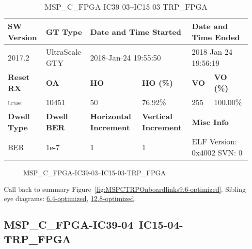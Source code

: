 \begin{table}[h]
\centering
\caption{MSP\_C\_FPGA-IC39-03--IC15-03-TRP\_FPGA}
\label{tab:MSPCFPGAIC3903IC1503TRPFPGA9.6-optimized}
\begin{tabular}{@{}|l|l|l|l|l|l|@{}}
\toprule
\textbf{SW Version}                & \textbf{GT Type}   & \multicolumn{2}{l|}{\textbf{Date and Time Started}}            & \multicolumn{2}{l|}{\textbf{Date and Time Ended}}        \\ \midrule
2017.2                       & UltraScale GTY          & \multicolumn{2}{l|}{2018-Jan-24 19:55:50}                   & \multicolumn{2}{l|}{2018-Jan-24 19:56:19}               \\ \midrule
\textbf{Reset RX}                  & \textbf{OA} & \textbf{HO}   & \textbf{HO (\%)} & \textbf{VO} & \textbf{VO (\%)} \\ \midrule
true & 10451        & 50          & 76.92\%        & 255        & 100.00\%       \\ \midrule
\textbf{Dwell Type}                & \textbf{Dwell BER} & \textbf{Horizontal Increment} & \textbf{Vertical Increment}    & \multicolumn{2}{l|}{\textbf{Misc Info}}                  \\ \midrule
BER                            & 1e-7        & 1        & 1           & \multicolumn{2}{l|}{ELF Version: 0x4002 SVN: 0}                         \\ \bottomrule
\end{tabular}
\end{table}

\begin{figure}[h]
\caption{MSP\_C\_FPGA-IC39-03--IC15-03-TRP\_FPGA} \label{fig:MSPCFPGAIC3903IC1503TRPFPGA9.6-optimized}
\end{figure}

Call back to summary Figure~\ref{fig:MSPCTRPOnboardlinks9.6-optimized}.
Sibling eye diagrams: \hyperref[sec:MSPCFPGAIC3903IC1503TRPFPGA6.4-optimized]{6.4-optimized}, \hyperref[sec:MSPCFPGAIC3903IC1503TRPFPGA12.8-optimized]{12.8-optimized}.

\clearpage
\newpage


\subsection{MSP\_C\_FPGA-IC39-04--IC15-04-TRP\_FPGA}\label{sec:MSPCFPGAIC3904IC1504TRPFPGA9.6-optimized}


